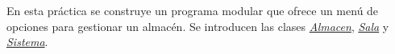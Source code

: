 En esta práctica se construye un programa modular que ofrece un menú de opciones para gestionar un almacén. Se introducen las clases {\itshape \hyperlink{class_almacen}{Almacen}}, {\itshape \hyperlink{class_sala}{Sala}} y {\itshape \hyperlink{class_sistema}{Sistema}}. 